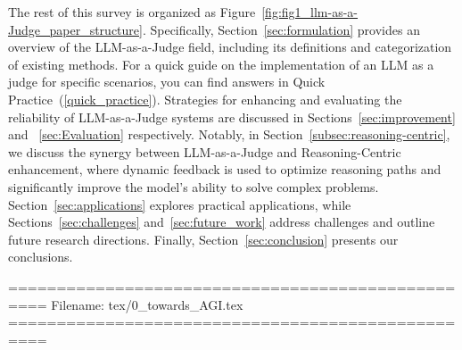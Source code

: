 The rest of this survey is organized as Figure~\ref{fig:fig1_llm-as-a-Judge_paper_structure}. Specifically, Section~\ref{sec:formulation} provides an overview of the LLM-as-a-Judge field, including its definitions and categorization of existing methods. For a quick guide on the implementation of an LLM as a judge for specific scenarios, you can find answers in Quick Practice~(\ref{quick_practice}). Strategies for enhancing and evaluating the reliability of LLM-as-a-Judge systems are discussed in Sections~\ref{sec:improvement} and ~\ref{sec:Evaluation} respectively. Notably, in Section~\ref{subsec:reasoning-centric}, we discuss the synergy between LLM-as-a-Judge and Reasoning-Centric enhancement, where dynamic feedback is used to optimize reasoning paths and significantly improve the model's ability to solve complex problems. Section~\ref{sec:applications} explores practical applications, while Sections~\ref{sec:challenges} and~\ref{sec:future_work} address challenges and outline future research directions. Finally, Section~\ref{sec:conclusion} presents our conclusions.



==================================================
Filename: tex/0_towards_AGI.tex
==================================================





